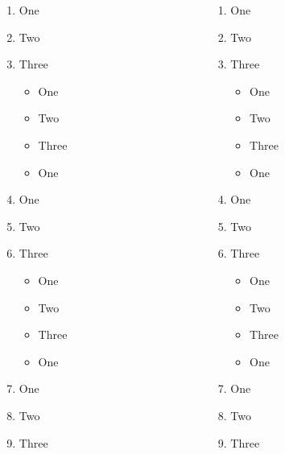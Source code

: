 \documentclass[12pt]{beamer}
\begin{document}
\newcommand{\lista}[1][<+->]{
    \begin{enumerate}[#1]
        \item One
        \item Two
        \item Three
            \begin{itemize}[#1]
                \item One
                \item Two
                \item Three
                \item One
            \end{itemize}
        \item One
        \item Two
        \item Three
            \begin{itemize}
                \item One
                \item Two
                \item Three
                \item One
            \end{itemize}
        \item One
        \item Two
        \item Three
    \end{enumerate}

}
\begin{frame}
    \begin{columns}
        \begin{column}{0.4\textwidth}
            \lista[]
        \end{column}
        \begin{column}{0.4\textwidth}
            \lista[]
        \end{column}
    \end{columns}
\end{frame}
\end{document}
